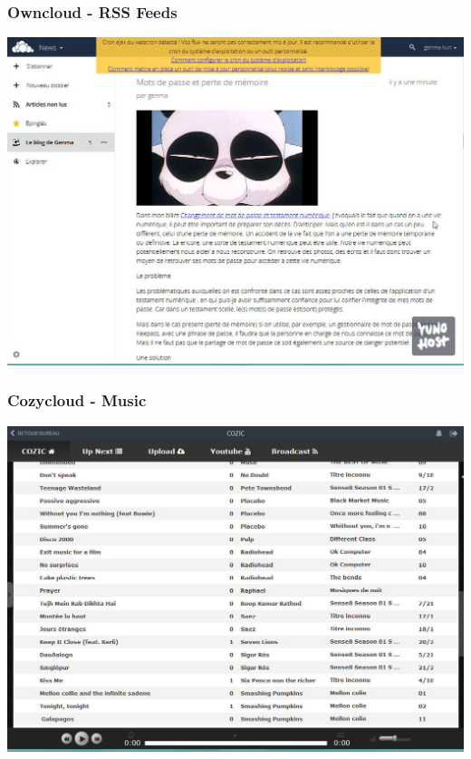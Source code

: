 \documentclass{beamer}
\begin{document}
\begin{frame}
\frametitle{Owncloud - RSS Feeds}
\includegraphics[scale=0.3] {./Owncloud/Owncloud_News.jpg}
\end{frame}
\begin{frame}
\frametitle{Cozycloud - Music}
\includegraphics[scale=0.3] {./CozyCloud/CozyCloud_Cozic.jpg}
\end{frame}
\end{document}

